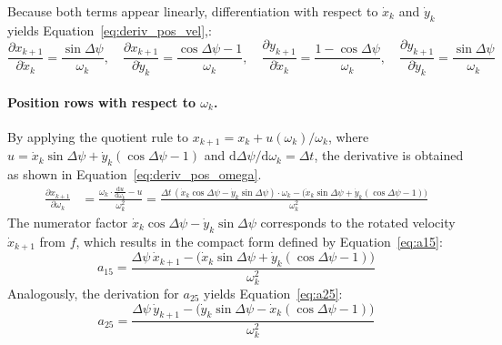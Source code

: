  Because both terms appear linearly, differentiation with respect to $\dot{x}_k$ and $\dot{y}_k$ yields Equation~\ref{eq:deriv_pos_vel},:
\begin{equation}
    \frac{\partial x_{k+1}}{\partial \dot{x}_k} = \frac{\sin\Delta\psi}{\omega_k}, \quad
    \frac{\partial x_{k+1}}{\partial \dot{y}_k} = \frac{\cos\Delta\psi - 1}{\omega_k}, \quad
    \frac{\partial y_{k+1}}{\partial \dot{x}_k} = \frac{1 - \cos\Delta\psi}{\omega_k}, \quad
    \frac{\partial y_{k+1}}{\partial \dot{y}_k} = \frac{\sin\Delta\psi}{\omega_k}
    \label{eq:deriv_pos_vel}
\end{equation}

\paragraph{Position rows with respect to $\omega_k$.}
By applying the quotient rule to $x_{k+1} = x_k + u(\omega_k)/\omega_k$, where $u = \dot{x}_k\sin\Delta\psi + \dot{y}_k(\cos\Delta\psi - 1)$ and $\mathrm{d}\Delta\psi/\mathrm{d}\omega_k = \Delta t$, the derivative is obtained as shown in Equation~\ref{eq:deriv_pos_omega}.
\begin{align}
    \frac{\partial x_{k+1}}{\partial \omega_k}
    &= \frac{\omega_k \cdot \frac{\mathrm{d}u}{\mathrm{d}\omega_k} - u}{\omega_k^2}
     = \frac{\Delta t\,(\dot{x}_k\cos\Delta\psi - \dot{y}_k\sin\Delta\psi)\cdot\omega_k
             - \bigl(\dot{x}_k\sin\Delta\psi + \dot{y}_k(\cos\Delta\psi-1)\bigr)}{\omega_k^2}
    \label{eq:deriv_pos_omega}
\end{align}
The numerator factor $\dot{x}_k\cos\Delta\psi - \dot{y}_k\sin\Delta\psi$ corresponds to the rotated velocity $\dot{x}_{k+1}$ from $f$, which results in the compact form defined by Equation~\ref{eq:a15}:
\begin{equation}
    a_{15} = \frac{\Delta\psi\,\dot{x}_{k+1} - \bigl(\dot{x}_k\sin\Delta\psi + \dot{y}_k(\cos\Delta\psi-1)\bigr)}{\omega_k^2}
    \label{eq:a15}
\end{equation}
Analogously, the derivation for $a_{25}$ yields Equation~\ref{eq:a25}:
\begin{equation}
    a_{25} = \frac{\Delta\psi\,\dot{y}_{k+1} - \bigl(\dot{y}_k\sin\Delta\psi - \dot{x}_k(\cos\Delta\psi-1)\bigr)}{\omega_k^2}
    \label{eq:a25}
\end{equation}



